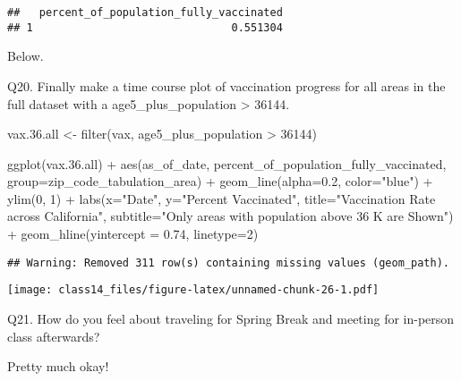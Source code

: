 \documentclass[
]{article}
\newenvironment{Shaded}{\begin{snugshade}}{\end{snugshade}}
\newcommand{\AttributeTok}[1]{\textcolor[rgb]{0.77,0.63,0.00}{#1}}
\newcommand{\DecValTok}[1]{\textcolor[rgb]{0.00,0.00,0.81}{#1}}
\newcommand{\FloatTok}[1]{\textcolor[rgb]{0.00,0.00,0.81}{#1}}
\newcommand{\FunctionTok}[1]{\textcolor[rgb]{0.00,0.00,0.00}{#1}}
\newcommand{\NormalTok}[1]{#1}
\newcommand{\OtherTok}[1]{\textcolor[rgb]{0.56,0.35,0.01}{#1}}
\newcommand{\SpecialCharTok}[1]{\textcolor[rgb]{0.00,0.00,0.00}{#1}}
\newcommand{\StringTok}[1]{\textcolor[rgb]{0.31,0.60,0.02}{#1}}
\begin{document}
\begin{verbatim}
##   percent_of_population_fully_vaccinated
## 1                               0.551304
\end{verbatim}

Below.

Q20. Finally make a time course plot of vaccination progress for all
areas in the full dataset with a age5\_plus\_population \textgreater{}
36144.

\begin{Shaded}
\begin{Highlighting}[]
\NormalTok{vax.}\FloatTok{36.}\NormalTok{all }\OtherTok{\textless{}{-}} \FunctionTok{filter}\NormalTok{(vax, age5\_plus\_population }\SpecialCharTok{\textgreater{}} \DecValTok{36144}\NormalTok{)}


\FunctionTok{ggplot}\NormalTok{(vax.}\FloatTok{36.}\NormalTok{all) }\SpecialCharTok{+}
  \FunctionTok{aes}\NormalTok{(as\_of\_date,}
\NormalTok{      percent\_of\_population\_fully\_vaccinated, }
      \AttributeTok{group=}\NormalTok{zip\_code\_tabulation\_area) }\SpecialCharTok{+}
  \FunctionTok{geom\_line}\NormalTok{(}\AttributeTok{alpha=}\FloatTok{0.2}\NormalTok{, }\AttributeTok{color=}\StringTok{"blue"}\NormalTok{) }\SpecialCharTok{+}
  \FunctionTok{ylim}\NormalTok{(}\DecValTok{0}\NormalTok{, }\DecValTok{1}\NormalTok{) }\SpecialCharTok{+}
  \FunctionTok{labs}\NormalTok{(}\AttributeTok{x=}\StringTok{"Date"}\NormalTok{, }\AttributeTok{y=}\StringTok{"Percent Vaccinated"}\NormalTok{,}
       \AttributeTok{title=}\StringTok{"Vaccination Rate across California"}\NormalTok{,}
       \AttributeTok{subtitle=}\StringTok{"Only areas with population above 36 K are Shown"}\NormalTok{) }\SpecialCharTok{+}
  \FunctionTok{geom\_hline}\NormalTok{(}\AttributeTok{yintercept =} \FloatTok{0.74}\NormalTok{, }\AttributeTok{linetype=}\DecValTok{2}\NormalTok{)}
\end{Highlighting}
\end{Shaded}

\begin{verbatim}
## Warning: Removed 311 row(s) containing missing values (geom_path).
\end{verbatim}

\texttt{[image: class14\_files/figure-latex/unnamed-chunk-26-1.pdf]}

Q21. How do you feel about traveling for Spring Break and meeting for
in-person class afterwards?

Pretty much okay!
\end{document}
